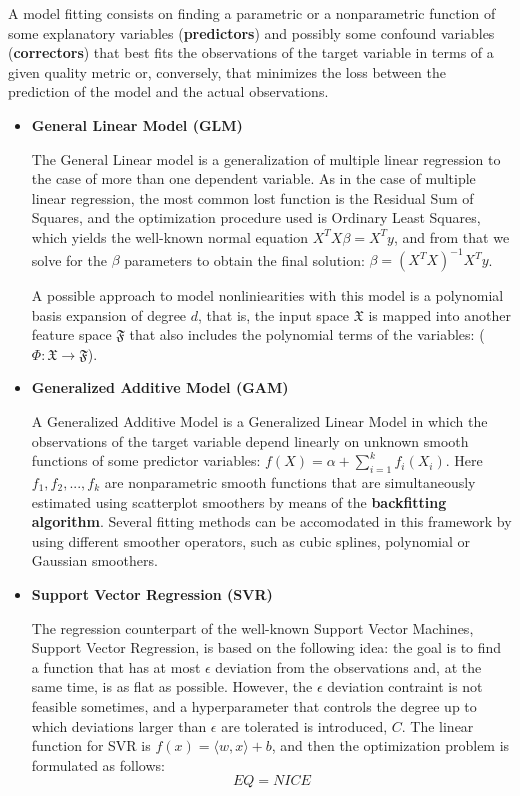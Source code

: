 \documentclass{article}
\begin{document}
A model fitting consists on finding a parametric or a nonparametric function of some explanatory variables (\textbf{predictors}) and possibly some confound variables (\textbf{correctors}) that best fits the observations of the target variable in terms of a given quality metric or, conversely, that minimizes the loss between the prediction of the model and the actual observations.
\begin{itemize}
\item \textbf{General Linear Model (GLM)} 

The General Linear model is a generalization of multiple linear regression to the case of more than one dependent variable. As in the case of multiple linear regression, the most common lost function is the Residual Sum of Squares, and the optimization procedure used is Ordinary Least Squares, which yields the well-known normal equation $ X^TX\beta = X^Ty $, and from that we solve for the $\beta$ parameters to obtain the final solution: $ \beta = (X^TX)^{-1}X^Ty $.

A possible approach to model nonliniearities with this model is a polynomial basis expansion of degree $d$, that is, the input space $\mathfrak{X}$ is mapped into another feature space $\mathfrak{F}$ that also includes the polynomial terms of the variables: ($\Phi : \mathfrak{X} \rightarrow \mathfrak{F}$).

\item \textbf{Generalized Additive Model (GAM)} 

A Generalized Additive Model is a Generalized Linear Model in which the observations of the target variable depend linearly on unknown smooth functions of some predictor variables: $ f(X) = \alpha + \sum_{i=1}^{k} f_i(X_i)$. Here $f_1, f_2, ..., f_k$ are nonparametric smooth functions that are simultaneously estimated using scatterplot smoothers by means of the \textbf{backfitting algorithm}. Several fitting methods can be accomodated in this framework by using different smoother operators, such as cubic splines, polynomial or Gaussian smoothers. 

\item \textbf{Support Vector Regression (SVR)} 

The regression counterpart of the well-known Support Vector Machines, Support Vector Regression, is based on the following idea: the goal is to find a function that has at most $\epsilon$ deviation from the observations and, at the same time, is as flat as possible. However, the $\epsilon$ deviation contraint is not feasible sometimes, and a hyperparameter that controls the degree up to which deviations larger than $\epsilon$ are tolerated is introduced, $C$. The linear function for SVR is $ f(x) = \langle w , x \rangle + b $, and then the optimization problem is formulated as follows:
\begin{equation}
	EQ = NICE
\end{equation}


\end{itemize}
\end{document}
